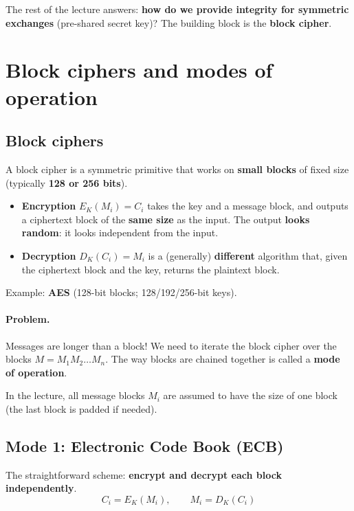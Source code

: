 The rest of the lecture answers: \textbf{how do we provide integrity for symmetric exchanges} (pre-shared secret key)? The building block is the \textbf{block cipher}.

\section{Block ciphers and modes of operation}

\subsection{Block ciphers}

\begin{definition}
A block cipher is a symmetric primitive that works on \textbf{small blocks} of fixed size (typically \textbf{128 or 256 bits}).
\begin{itemize}
    \item \textbf{Encryption} $E_K(M_i) = C_i$ takes the key and a message block, and outputs a ciphertext block of the \textbf{same size} as the input. The output \textbf{looks random}: it looks independent from the input.
    \item \textbf{Decryption} $D_K(C_i) = M_i$ is a (generally) \textbf{different} algorithm that, given the ciphertext block and the key, returns the plaintext block.
\end{itemize}
Example: \textbf{AES} (128-bit blocks; 128/192/256-bit keys).
\end{definition}

\paragraph{Problem.} Messages are longer than a block! We need to iterate the block cipher over the blocks $M = M_1 M_2 \dots M_n$. The way blocks are chained together is called a \textbf{mode of operation}.

\begin{remark}
In the lecture, all message blocks $M_i$ are assumed to have the size of one block (the last block is padded if needed).
\end{remark}

\subsection{Mode 1: Electronic Code Book (ECB)}

\begin{definition}[ECB]
The straightforward scheme: \textbf{encrypt and decrypt each block independently}.
\[
\boxed{C_i = E_K(M_i), \qquad M_i = D_K(C_i)}
\]
\end{definition}

